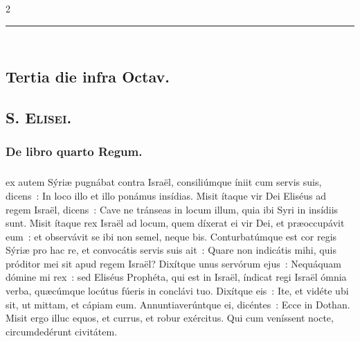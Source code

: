 \documentclass[9pt,twoside]{extarticle}
\begin{document}
\begin{multicols}{2}
\begin{center}\textcolor{red}{\rule{\linewidth}{0.5pt}} \end{center}

\subsection*{\center {}\\ Tertia die infra Octav.}
\subsection*{\center \textsc{S. Elisei.}}
\subsubsection*{\center {}}

\subsubsection*{\center De libro quarto Regum.}
\subsubsection*{\center {}}
ex autem Sýriæ pugnábat contra Israël, consiliúmque íniit cum servis suis, dicens~: In loco illo et illo ponámus insídias.
Misit ítaque vir Dei Eliséus ad regem Israël, dicens~: Cave ne tránseas in locum illum, quia ibi Syri in insídiis sunt.
Misit ítaque rex Israël ad locum, quem díxerat ei vir Dei, et præoccupávit eum~: et observávit se ibi non semel, neque bis.
Conturbatúmque est cor regis Sýriæ pro hac re, et convocátis servis suis ait~: Quare non indicátis mihi, quis próditor mei sit apud regem Israël?
Dixítque unus servórum ejus~: Nequáquam dómine mi rex~: sed Eliséus Prophéta, qui est in Israël, índicat regi Israël ómnia verba, quæcúmque locútus fúeris in conclávi tuo.
Dixítque eis~: Ite, et vidéte ubi sit, ut mittam, et cápiam eum. Annuntiaverúntque ei, dicéntes~: Ecce in Dothan.
Misit ergo illuc equos, et currus, et robur exércitus. Qui cum veníssent nocte, circumdedérunt civitátem.

\begin{tightlist}{}
\item {} 
\end{tightlist}


\end{multicols}
\end{document}
